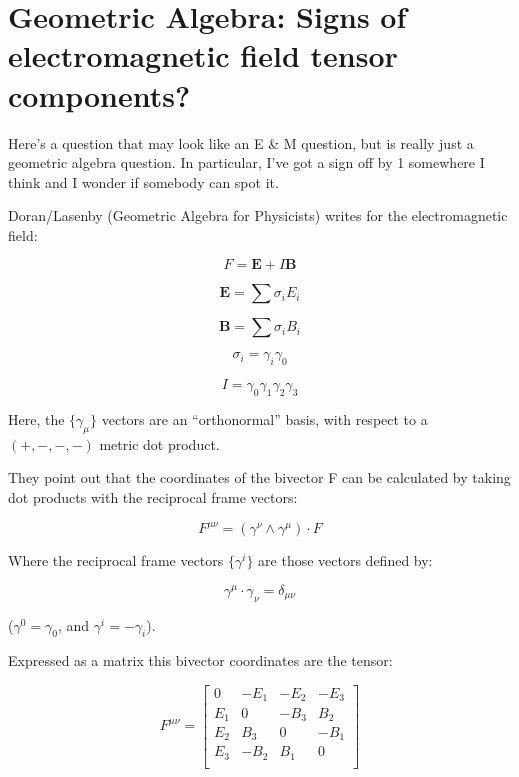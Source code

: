 \documentclass{article}      %
\title{} %
\author{Peeter Joot \quad peeter.joot@gmail.com}         %
\date{ May 30, 2008.  Last Revision: $Date: 2009/06/04 00:44:05 $ }
\begin{document}

\maketitle{}

\section{Geometric Algebra: Signs of electromagnetic field tensor components? }

Here's a question that may look like an E \& M question, but is really just a geometric algebra question.  In particular, I've got a sign off by 1 somewhere I think and I wonder if somebody can spot it.

Doran/Lasenby (Geometric Algebra for Physicists) writes for the electromagnetic field:

\[
F = \mathbf{E} + I\mathbf{B}
\]

\[
\mathbf{E} = \sum \sigma_i E_i
\]

\[
\mathbf{B} = \sum \sigma_i B_i
\]

\[
\sigma_i = \gamma_i \gamma_0
\]

\[
I = \gamma_0 \gamma_1 \gamma_2 \gamma_3
\]

Here, the $\{\gamma_\mu\}$ vectors are an ``orthonormal'' basis, with respect to a $(+,-,-,-)$ metric dot product.

They point out that the coordinates of the bivector F can be calculated by taking dot products with the reciprocal frame vectors:

\[
F^{\mu\nu} = (\gamma^\nu \wedge \gamma^\mu) \cdot F
\]

Where the reciprocal frame vectors $\{\gamma^i\}$ are those vectors defined by:

\[
\gamma^\mu \cdot \gamma_\nu = \delta_{\mu\nu}
\]

($\gamma^0 = \gamma_0$, and $\gamma^i = -\gamma_i$).

Expressed as a matrix this bivector coordinates are the tensor:

\[
F^{\mu\nu} =
\begin{bmatrix}
0 & -E_1 & -E_2 & -E_3 \\
E_1 & 0 & -B_3 & B_2 \\
E_2 & B_3 & 0 & -B_1 \\
E_3 & -B_2 & B_1 & 0 \\
\end{bmatrix}
\]
\end{document}
